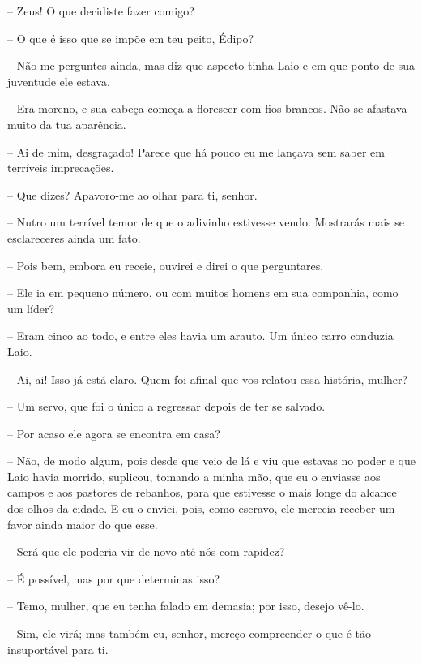  --   Zeus! O que decidiste fazer comigo?

 --   O que é isso que se impõe em teu peito, Édipo?

 --    Não me perguntes ainda, mas diz que aspecto tinha Laio e em que
ponto de sua juventude ele estava.

 --   Era moreno, e sua cabeça começa a florescer com fios brancos. Não se
afastava muito da tua aparência.

 --   Ai de mim, desgraçado! Parece que há pouco eu me lançava sem saber em
terríveis imprecações.

 --   Que dizes? Apavoro-me ao olhar para ti, senhor.

 --   Nutro um terrível temor de que o adivinho estivesse vendo. Mostrarás
mais se esclareceres ainda um fato.

 --   Pois bem, embora eu receie, ouvirei e direi o que perguntares.

 --    Ele ia em pequeno número, ou com muitos homens em sua companhia,
como um líder?

 --   Eram cinco ao todo, e entre eles havia um arauto. Um único carro
conduzia Laio.

 --   Ai, ai! Isso já está claro. Quem foi afinal que vos relatou essa
história, mulher?

 --   Um servo, que foi o único a regressar depois de ter se salvado.

 --   Por acaso ele agora se encontra em casa?

 --   Não, de modo algum, pois desde que veio de lá e viu que estavas no poder
e que  Laio havia morrido, suplicou, tomando a minha mão, que eu o
enviasse aos campos e aos pastores de rebanhos, para que estivesse o
mais longe do alcance dos olhos da cidade. E eu o enviei, pois, como
escravo, ele merecia receber um favor ainda maior do que esse.

 --   Será que ele poderia vir de novo até nós com rapidez?

 --   É possível, mas por que determinas isso?

 --   Temo, mulher, que eu tenha falado em demasia; por isso, desejo vê-lo.

 --    Sim, ele virá; mas também eu, senhor, mereço compreender o que é
tão insuportável para ti.

